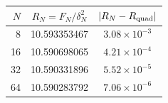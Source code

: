 \begin{tabular}{rcc}\hline $N$ & $R_N=F_N/\delta_N^2$ & $|R_N-R_{\rm quad}|$\\\hline
8 & 10.593353467 & $3.08\times10^{-3}$ \\
16 & 10.590698065 & $4.21\times10^{-4}$ \\
32 & 10.590331896 & $5.52\times10^{-5}$ \\
64 & 10.590283792 & $7.06\times10^{-6}$ \\
\hline\end{tabular}
